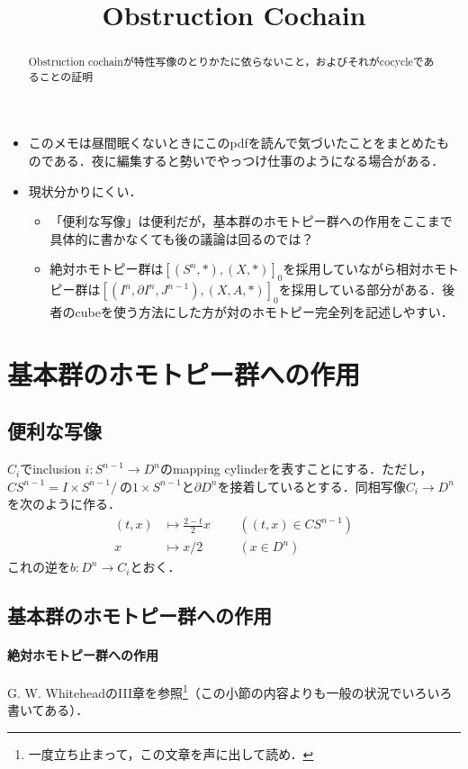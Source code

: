 \documentclass[a4paper,11pt]{jsarticle}
\theoremstyle{definition}
\begin{document}
\begin{itemize}
  \item このメモは昼間眠くないときにこのpdfを読んで気づいたことをまとめたものである．夜に編集すると勢いでやっつけ仕事のようになる場合がある．
  \item 現状分かりにくい．\begin{itemize}
    \item 「便利な写像」は便利だが，基本群のホモトピー群への作用をここまで具体的に書かなくても後の議論は回るのでは？
    \item 絶対ホモトピー群は$[(S^n,*),(X,*)]_0$を採用していながら相対ホモトピー群は$[(I^n,\partial I^n,J^{n-1}),(X,A,*)]_0$を採用している部分がある．後者のcubeを使う方法にした方が対のホモトピー完全列を記述しやすい．
  \end{itemize}
\end{itemize}

\date{}
\title{Obstruction Cochain}

\maketitle

\begin{abstract}
  Obstruction cochainが特性写像のとりかたに依らないこと，およびそれがcocycleであることの証明
\end{abstract}
\tableofcontents
\section{基本群のホモトピー群への作用}
\subsection{便利な写像}
$C_i$でinclusion $i\colon S^{n-1}\to D^n$のmapping cylinderを表すことにする．ただし，$CS^{n-1}=I\times S^{n-1}/~$の$1\times S^{n-1}$と$\partial D^n$を接着しているとする．同相写像$C_i\to D^n$を次のように作る．\[
  \begin{alignedat}{2}
  (t,x)&\mapsto \frac{2-t}{2}x&\ \ \ &((t,x)\in CS^{n-1})\\
  x&\mapsto x/2&&(x\in D^n)
\end{alignedat}
\]これの逆を$b\colon D^n\to C_i$とおく．
\subsection{基本群のホモトピー群への作用}
\paragraph{絶対ホモトピー群への作用}
G. W. WhiteheadのIII章を参照\footnote{一度立ち止まって，この文章を声に出して読め．}（この小節の内容よりも一般の状況でいろいろ書いてある）．
\end{document}
